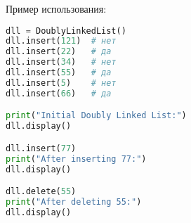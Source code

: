 \begin{enumerate}
Пример использования:
\begin{lstlisting}[language=Python]
dll = DoublyLinkedList()
dll.insert(121)  # нет
dll.insert(22)   # да
dll.insert(34)   # нет
dll.insert(55)   # да
dll.insert(5)    # нет
dll.insert(66)   # да

print("Initial Doubly Linked List:")
dll.display()

dll.insert(77)
print("After inserting 77:")
dll.display()

dll.delete(55)
print("After deleting 55:")
dll.display()
\end{lstlisting}

\end{enumerate}